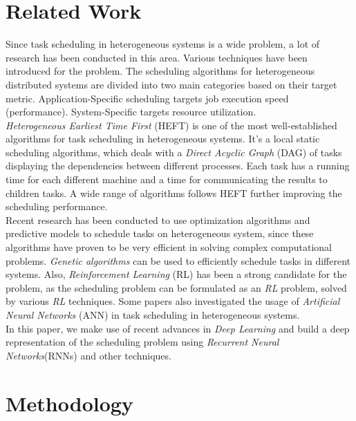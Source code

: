\documentclass[twocolumn,11pt]{IEEEtran}
\begin{document}
\section{Related Work}

Since task scheduling in heterogeneous systems is a wide problem, a lot of research has been conducted in this area. Various techniques have been introduced for the problem. 
The scheduling algorithms for heterogeneous distributed systems are divided into two main categories based on their target metric. Application-Specific scheduling targets job execution speed (performance). System-Specific targets resource utilization. \\
\emph{Heterogeneous Earliest Time First} (HEFT)\cite{993206} is one of the most well-established algorithms for task scheduling in heterogeneous systems. 
It's a local static scheduling algorithms, which deals with a \emph{Direct Acyclic Graph} (DAG) of tasks displaying the dependencies between different processes. Each task has a running time for each different machine and a time for communicating the results to children tasks. 
A wide range of algorithms\cite{inbook} follows HEFT further improving the scheduling performance. \\
Recent research has been conducted to use optimization algorithms and predictive models to schedule tasks on heterogeneous system, since these algorithms have proven to be very efficient in solving complex computational problems. 
\emph{Genetic algorithms}\cite{article2} can be used to efficiently schedule tasks in different systems. Also, \emph{Reinforcement Learning} (RL)\cite{ORHEAN2018292} has been a strong candidate for the problem, as the scheduling problem can be formulated as an \emph{RL} problem, solved by various \emph{RL} techniques. 
Some papers also investigated the usage of \emph{Artificial Neural Networks} (ANN)\cite{article3} in task scheduling in heterogeneous systems. \\ 
In this paper, we make use of recent advances in \emph{Deep Learning} and build a deep representation of the scheduling problem using \emph{Recurrent Neural Networks}(RNNs)\cite{chung2014empirical} and other techniques.

\section{Methodology}
\end{document}
